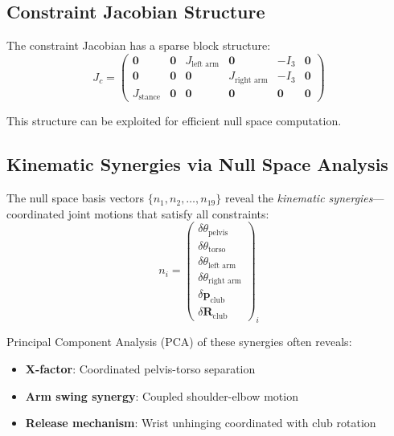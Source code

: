 \documentclass[11pt,a4paper]{article}
\theoremstyle{definition}
\newcommand{\Jc}{J_c}
\begin{document}
\subsection{Constraint Jacobian Structure}

The constraint Jacobian has a sparse block structure:
\begin{equation}
    \Jc = \begin{pmatrix}
        \bm{0} & \bm{0} & J_{\text{left arm}} & \bm{0} & -I_3 & \bm{0} \\
        \bm{0} & \bm{0} & \bm{0} & J_{\text{right arm}} & -I_3 & \bm{0} \\
        J_{\text{stance}} & \bm{0} & \bm{0} & \bm{0} & \bm{0} & \bm{0}
    \end{pmatrix}
\end{equation}

This structure can be exploited for efficient null space computation.

\subsection{Kinematic Synergies via Null Space Analysis}

The null space basis vectors $\{n_1, n_2, \ldots, n_{19}\}$ reveal the \emph{kinematic synergies}---coordinated joint motions that satisfy all constraints:
\begin{equation}
    n_i = \begin{pmatrix} \delta\theta_{\text{pelvis}} \\ \delta\theta_{\text{torso}} \\ \delta\theta_{\text{left arm}} \\ \delta\theta_{\text{right arm}} \\ \delta\bm{p}_{\text{club}} \\ \delta\bm{R}_{\text{club}} \end{pmatrix}_i
\end{equation}

Principal Component Analysis (PCA) of these synergies often reveals:
\begin{itemize}[noitemsep]
    \item \textbf{X-factor}: Coordinated pelvis-torso separation
    \item \textbf{Arm swing synergy}: Coupled shoulder-elbow motion
    \item \textbf{Release mechanism}: Wrist unhinging coordinated with club rotation
\end{itemize}
\end{document}
